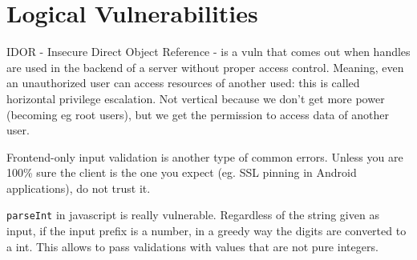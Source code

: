 \chapter{Logical Vulnerabilities}
IDOR - Insecure Direct Object Reference - is a vuln that comes out when handles are used in the backend of a server without proper access control.
Meaning, even an unauthorized user can access resources of another used: this is called horizontal privilege escalation.
Not vertical because we don't get more power (becoming eg root users), but we get the permission to access data of another user.

Frontend-only input validation is another type of common errors.
Unless you are 100\% sure the client is the one you expect (eg. SSL pinning in Android applications), do not trust it.

\texttt{parseInt} in javascript is really vulnerable.
Regardless of the string given as input, if the input prefix is a number, in a greedy way the digits are converted to a int.
This allows to pass validations with values that are not pure integers.